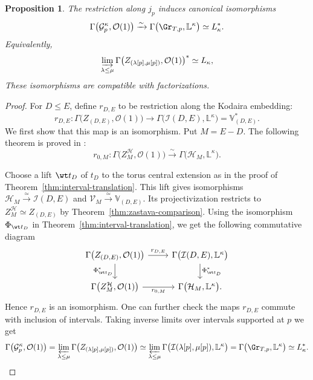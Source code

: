 \documentclass{amsart}
\numberwithin{equation}{section}
\numberwithin{figure}{section}
\newtheorem{prop}[thm]{Proposition}
\theoremstyle{definition}
\theoremstyle{remark}
\renewcommand{\c}[1]{\mathcal{#1}}
\renewcommand{\b}[1]{\mathbb{#1}}
\begin{document}
\begin{prop}
	\label{prop:grassmannian-lattice-vertex-algebra}
	The restriction along $j_p$ induces
	canonical isomorphisms
	\[
	\Gamma\bigl(\c G^\kappa_p,\c O(1)\bigr)
	\xrightarrow{\sim}
	\Gamma\bigl(\Gr_{T,p},\b L^\kappa\bigr)
	\simeq L_\kappa^*.
	\]
	Equivalently,
	\[
	\varinjlim_{\lambda\leq\mu}
	\Gamma\bigl(
	Z_{(\lambda[p],\mu[p])},\c O(1)
	\bigr)^*
	\simeq L_\kappa,
	\]
	These isomorphisms are compatible with
	factorizations.
\end{prop}

\begin{proof}
	For $D\leq E$, define $r_{D,E}$ to be restriction
	along the Kodaira embedding:
	\[
	r_{D,E}:
	\Gamma\bigl(Z_{(D,E)},\c O(1)\bigr)
	\longrightarrow
	\Gamma\bigl(\c I(D,E),\b L^\kappa\bigr)
	=
	\b V_{(D,E)}^*.
	\]
	We first show that this map is an isomorphism. 	
	Put $M=E-D$. The following theorem is proved in \cite[\S2.4.3]{mirkovic2021loop}:
	$$r_{0,M}:
	\Gamma\bigl(Z^{\c H}_M,\c O(1)\bigr)
	\xrightarrow{\sim}
	\Gamma\bigl(\c H_M,\b L^\kappa\bigr).$$
	
	Choose a lift $\wt t_D$ of $t_D$ to the torus central extension as in the proof
	of Theorem~\ref{thm:interval-translation}.
	This lift gives isomorphisms
	$\c H_M\xrightarrow{\simeq}\c I(D,E)$ and
	$\c V_M\xrightarrow{\simeq}\b V_{(D,E)}$.
	Its projectivization restricts to $Z^{\c H}_M\simeq Z_{(D,E)}$ by
	Theorem~\ref{thm:zastava-comparison}. Using the isomorphism $\Phi_{\wt t_D}$ in Theorem~\ref{thm:interval-translation}, we get the following commutative diagram
	\[
	\begin{tikzcd}
		\Gamma\bigl(Z_{(D,E)},\c O(1)\bigr)
		\arrow[r,"r_{D,E}"]
		\arrow[d,"\Phi_{\wt t_D}^*"']
		&
		\Gamma\bigl(\c I(D,E),\b L^\kappa\bigr)
		\arrow[d,"\Phi_{\wt t_D}^*"]
		\\
		\Gamma\bigl(Z^{\c H}_M,\c O(1)\bigr)
		\arrow[r,"r_{0,M}"']
		&
		\Gamma\bigl(\c H_M,\b L^\kappa\bigr).
	\end{tikzcd}
	\]
	Hence $r_{D,E}$ is an isomorphism. 	One can further check the maps $r_{D,E}$ commute with inclusion of intervals. Taking inverse limits over intervals supported at $p$ we get
	\[	\Gamma\bigl(\c G^\kappa_p,\c O(1)\bigr)
		=\varprojlim_{\lambda\leq\mu}
		\Gamma\bigl(
		Z_{(\lambda[p],\mu[p])},\c O(1)
		\bigr)
	\simeq
	\varprojlim_{\lambda\leq\mu}
		\Gamma\bigl(
		\c I(\lambda[p],\mu[p]),\b L^\kappa
		\bigr)
		=\Gamma\bigl(\Gr_{T,p},\b L^\kappa\bigr)\simeq L_\kappa^*.
	\]
\end{proof}
\end{document}
